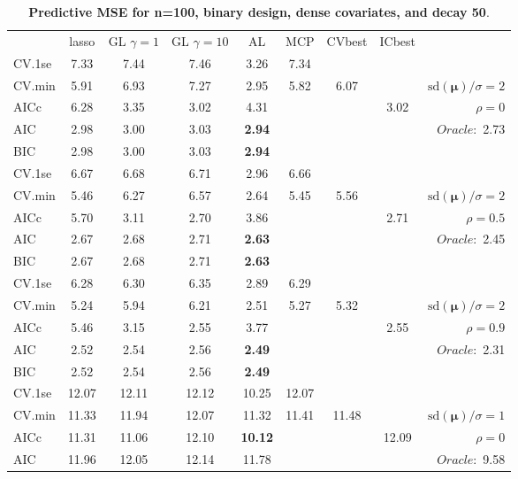 \clearpage
\begin{table}\vspace{-.5cm}
\caption[l]{ { \bf Predictive MSE for n=100, binary design, 
dense covariates, and  decay  50}.}
\vspace{-.5cm}
\footnotesize{}
\begin{center}
\begin{tabular}{l*{7}{c}|r}
 & lasso & GL $\gamma=1$ & GL $\gamma=10$ & AL & MCP  & CVbest & ICbest  \\
\cline{1-9}
CV.1se & 7.33 & 7.44 & 7.46 & 3.26 & 7.34 & & & \\
CV.min & 5.91 & 6.93 & 7.27 & 2.95 & 5.82 & 6.07 & & $\mathrm{sd}(\mathbf{\mu})/\sigma=2$ \\
AICc & 6.28 & 3.35 & 3.02 & 4.31 & & & 3.02 &  $\rho=0$ \\
AIC & 2.98 & 3.00 & 3.03 & {\bf 2.94} & & & &  \multirow{2}{*}{$Oracle: $ 2.73} \\
BIC & 2.98 & 3.00 & 3.03 & {\bf 2.94} & & & &  \\
 \hline 
CV.1se & 6.67 & 6.68 & 6.71 & 2.96 & 6.66 & & & \\
CV.min & 5.46 & 6.27 & 6.57 & 2.64 & 5.45 & 5.56 & & $\mathrm{sd}(\mathbf{\mu})/\sigma=2$ \\
AICc & 5.70 & 3.11 & 2.70 & 3.86 & & & 2.71 &  $\rho=0.5$ \\
AIC & 2.67 & 2.68 & 2.71 & {\bf 2.63} & & & &  \multirow{2}{*}{$Oracle: $ 2.45} \\
BIC & 2.67 & 2.68 & 2.71 & {\bf 2.63} & & & &  \\
 \hline 
CV.1se & 6.28 & 6.30 & 6.35 & 2.89 & 6.29 & & & \\
CV.min & 5.24 & 5.94 & 6.21 & 2.51 & 5.27 & 5.32 & & $\mathrm{sd}(\mathbf{\mu})/\sigma=2$ \\
AICc & 5.46 & 3.15 & 2.55 & 3.77 & & & 2.55 &  $\rho=0.9$ \\
AIC & 2.52 & 2.54 & 2.56 & {\bf 2.49} & & & &  \multirow{2}{*}{$Oracle: $ 2.31} \\
BIC & 2.52 & 2.54 & 2.56 & {\bf 2.49} & & & &  \\
 \hline 
CV.1se & 12.07 & 12.11 & 12.12 & 10.25 & 12.07 & & & \\
CV.min & 11.33 & 11.94 & 12.07 & 11.32 & 11.41 & 11.48 & & $\mathrm{sd}(\mathbf{\mu})/\sigma=1$ \\
AICc & 11.31 & 11.06 & 12.10 & {\bf 10.12} & & & 12.09 &  $\rho=0$ \\
AIC & 11.96 & 12.05 & 12.14 & 11.78 & & & &  \multirow{2}{*}{$Oracle: $ 9.58} \\

\end{tabular}
\end{center}
\end{table}
